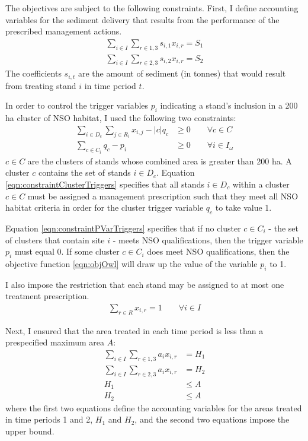 The objectives are subject to the following constraints. First, I define accounting variables for the sediment delivery that results from the performance of the prescribed management actions.
\begin{align}
\sum_{i\in I} \sum_{r\in 1,3} s_{i,1} x_{i,r} = S_1 \label{eqn:constraintSediment1}\\
\sum_{i\in I} \sum_{r\in 2,3} s_{i,2} x_{i,r} = S_2 \label{eqn:constraintSediment2}
\end{align}
The coefficients $s_{i,t}$ are the amount of sediment (in tonnes) that would result from treating stand $i$ in time period $t$.

In order to control the trigger variables $p_i$ indicating a stand's inclusion in a 200 ha cluster of NSO habitat, I used the following two constraints:
\begin{align}
\sum_{i \in D_c} \sum_{j \in R_i} x_{i,j} - |c| q_c &\ge 0 \qquad \forall c \in C \label{eqn:constraintClusterTriggers}\\
\sum_{c \in C_i} q_c - p_i &\ge 0 \qquad \forall i \in I_\omega \label{eqn:constraintPVarTriggers}
\end{align}
$c \in C$ are the clusters of stands whose combined area is greater than 200 ha. A cluster $c$ contains the set of stands $i \in D_c$. Equation \eqref{eqn:constraintClusterTriggers} specifies that all stands $i \in D_c$ within a cluster $c \in C$ must be assigned a management prescription such that they meet all NSO habitat criteria in order for the cluster trigger variable $q_c$ to take value 1.

Equation \eqref{eqn:constraintPVarTriggers} specifies that if no cluster $c \in C_i$ - the set of clusters that contain site $i$ - meets NSO qualifications, then the trigger variable $p_i$ must equal 0. If some cluster $c \in C_i$ does meet NSO qualifications, then the objective function \eqref{eqn:objOwl} will draw up the value of the variable $p_i$ to 1.

I also impose the restriction that each stand may be assigned to at most one treatment prescription.
\begin{align}
\sum_{r \in R} x_{i,r} = 1  \qquad \forall i \in I \label{eqn:constraintOnePrescrip}
\end{align}

Next, I ensured that the area treated in each time period is less than a prespecified maximum area $A$:
\begin{align}
\sum_{i \in I} \sum_{r \in 1,3} a_i x_{i,r} &= H_1 \label{eqn:constraintAreaAcctg1}\\
\sum_{i \in I} \sum_{r \in 2,3} a_i x_{i,r} &= H_2 \label{eqn:constraintAreaAcctg2}\\
H_1 &\le A \label{eqn:constraintAreaRestr1}\\
H_2 &\le A \label{eqn:constraintAreaRestr2}
\end{align}
where the first two equations define the accounting variables for the areas treated in time periods 1 and 2, $H_1$ and $H_2$, and the second two equations impose the upper bound.

